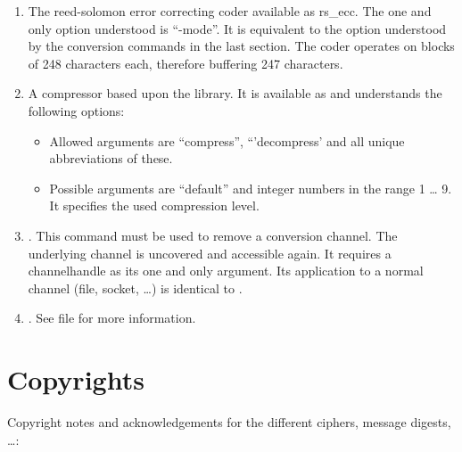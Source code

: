 \begin	{enumerate}
\item	The reed-solomon error correcting coder available as \cmd
	{rs\_ecc}. The one and only option understood is ``-mode''. It
	is equivalent to the option understood by the conversion
	commands in the last section. The coder operates on blocks of
	248 characters each, therefore buffering 247 characters.

\item	A compressor based upon the  library. It is
	available as  and understands the following options:

	\begin	{itemize}
	\item[-mode]	Allowed arguments are ``compress'',
			``'decompress' and all unique abbreviations of
			these.
	\item[-level]	Possible arguments are ``default'' and integer
			numbers in the range 1 \dots{} 9. It specifies
			the used compression level.
	\end	{itemize}

\item	{}. This command must be used to remove a
	conversion channel. The underlying channel is uncovered and
	accessible again. It requires a channelhandle as its one and only
	argument. Its application to a normal channel (file, socket,
	\dots {}) is identical to .

\item	{}. See file  for more
	information.
\end	{enumerate}

\chapter {Copyrights}\label {copyright}

Copyright notes and acknowledgements for the different ciphers,
message digests, \dots {}:

